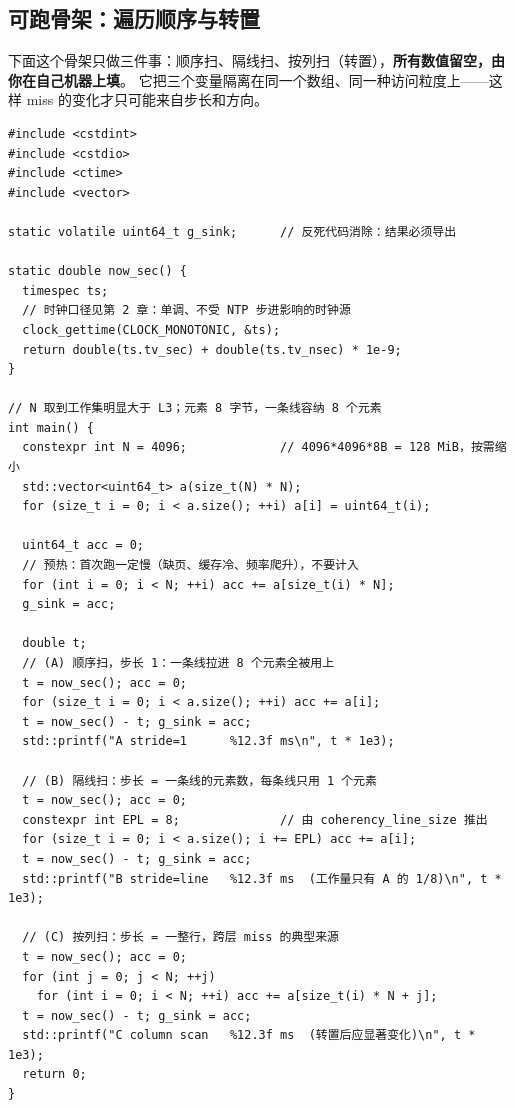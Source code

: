 \documentclass[12pt,a4paper,fontset=fandol]{ctexbook}
\begin{document}
\subsection{可跑骨架：遍历顺序与转置}

下面这个骨架只做三件事：顺序扫、隔线扫、按列扫（转置），\textbf{所有数值留空，由你在自己机器上填}。
它把三个变量隔离在同一个数组、同一种访问粒度上——这样 miss 的变化才只可能来自步长和方向。

\begin{lstlisting}[style=cppstyle,caption={局部性对照骨架：步长与遍历方向（数值由读者填写）},label={lst:pm06-traverse}]
#include <cstdint>
#include <cstdio>
#include <ctime>
#include <vector>

static volatile uint64_t g_sink;      // 反死代码消除：结果必须导出

static double now_sec() {
  timespec ts;
  // 时钟口径见第 2 章：单调、不受 NTP 步进影响的时钟源
  clock_gettime(CLOCK_MONOTONIC, &ts);
  return double(ts.tv_sec) + double(ts.tv_nsec) * 1e-9;
}

// N 取到工作集明显大于 L3；元素 8 字节，一条线容纳 8 个元素
int main() {
  constexpr int N = 4096;             // 4096*4096*8B = 128 MiB，按需缩小
  std::vector<uint64_t> a(size_t(N) * N);
  for (size_t i = 0; i < a.size(); ++i) a[i] = uint64_t(i);

  uint64_t acc = 0;
  // 预热：首次跑一定慢（缺页、缓存冷、频率爬升），不要计入
  for (int i = 0; i < N; ++i) acc += a[size_t(i) * N];
  g_sink = acc;

  double t;
  // (A) 顺序扫，步长 1：一条线拉进 8 个元素全被用上
  t = now_sec(); acc = 0;
  for (size_t i = 0; i < a.size(); ++i) acc += a[i];
  t = now_sec() - t; g_sink = acc;
  std::printf("A stride=1      %12.3f ms\n", t * 1e3);

  // (B) 隔线扫：步长 = 一条线的元素数，每条线只用 1 个元素
  t = now_sec(); acc = 0;
  constexpr int EPL = 8;              // 由 coherency_line_size 推出
  for (size_t i = 0; i < a.size(); i += EPL) acc += a[i];
  t = now_sec() - t; g_sink = acc;
  std::printf("B stride=line   %12.3f ms  (工作量只有 A 的 1/8)\n", t * 1e3);

  // (C) 按列扫：步长 = 一整行，跨层 miss 的典型来源
  t = now_sec(); acc = 0;
  for (int j = 0; j < N; ++j)
    for (int i = 0; i < N; ++i) acc += a[size_t(i) * N + j];
  t = now_sec() - t; g_sink = acc;
  std::printf("C column scan   %12.3f ms  (转置后应显著变化)\n", t * 1e3);
  return 0;
}
\end{lstlisting}
\end{document}
